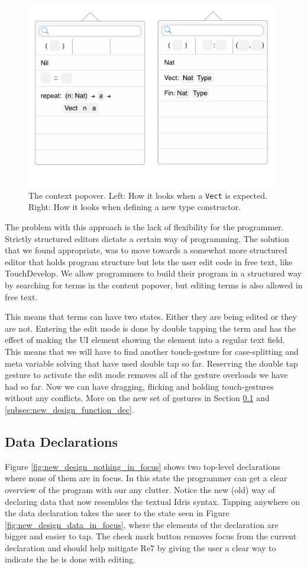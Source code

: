 \begin{figure}
	\centering
		\includegraphics[width=110mm]{diagrams/final_design_popover.pdf}
	\caption{The context popover. Left: How it looks when a \texttt{Vect} is
	expected. Right: How it looks when defining a new type constructor.}
\label{fig:new_design_popover}
\end{figure}

The problem with this approach is the lack of flexibility for the programmer.
Strictly structured editors dictate a certain way of programming. The solution
that we found appropriate, was to move towards a somewhat more structured editor that holds program structure but lets the user edit code in free text, like TouchDevelop. We allow programmers
to build their program in a structured way by searching for terms in the
content popover, but editing terms is also allowed in free text.

This means that terms can have two states. Either they are being edited or they are not. Entering the edit mode is done by double tapping the term and has the effect of making the UI element showing the element into a regular text field. This means that we will have to find another touch-gesture for case-splitting and meta variable solving
that have used double tap so far. Reserving
the double tap
gesture to activate the edit mode removes all of the gesture overloads we have
had so far. Now we can have dragging, flicking and holding touch-gestures
without any conflicts. More on the new set of gestures in Section \ref{subsec:new_design_data_dec} and \ref{subsec:new_design_function_dec}.

\subsection{Data Declarations}
\label{subsec:new_design_data_dec}
Figure \ref{fig:new_design_nothing_in_focus} shows two top-level declarations
where none of them are in focus. In this state the programmer can get a clear
overview of the program with our any clutter. Notice the new (old) way of
declaring data that now resembles the textual Idris syntax. Tapping anywhere on
the data declaration takes the user to the state seen in Figure \ref{fig:new_design_data_in_focus},
where the elements of the declaration are bigger and easier to tap. The check mark button
removes focus from the current declaration and should help mitigate Re7 by
giving the user a clear way to indicate the he is done with editing. 

